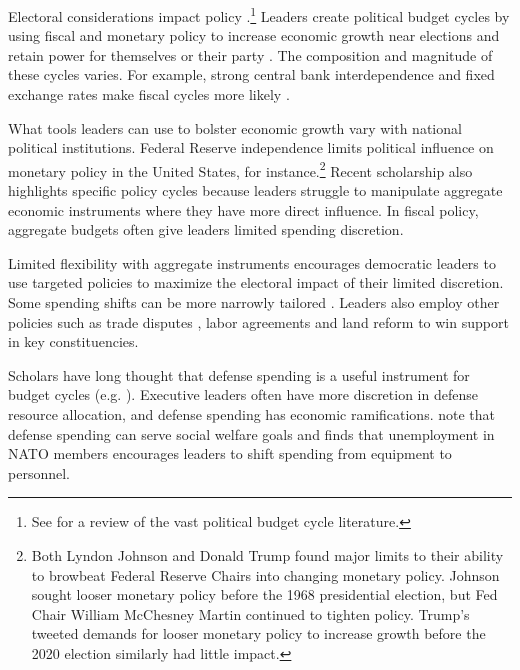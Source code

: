 \documentclass[12pt]{article}
\begin{document}
Electoral considerations impact policy \citep{Nordhaus1975}.\footnote{See \citet{Dubois2016} for a review of the vast political budget cycle literature.} 
Leaders create political budget cycles by using fiscal and monetary policy to increase economic growth near elections and retain power for themselves or their party \citep{Tufte1978, Rogoff1987}. 
The composition and magnitude of these cycles varies. 
For example, strong central bank interdependence and fixed exchange rates make fiscal cycles more likely \citep{ClarkHallerberg2000}. 


What tools leaders can use to bolster economic growth vary with national political institutions. 
Federal Reserve independence limits political influence on monetary policy in the United States, for instance.\footnote{Both Lyndon Johnson and Donald Trump found major limits to their ability to browbeat Federal Reserve Chairs into changing monetary policy. 
Johnson sought looser monetary policy before the 1968 presidential election, but Fed Chair William McChesney Martin continued to tighten policy.
Trump's tweeted demands for looser monetary policy to increase growth before the 2020 election similarly had little impact.}
Recent scholarship also highlights specific policy cycles because leaders struggle to manipulate aggregate economic instruments where they have more direct influence. 
In fiscal policy, aggregate budgets often give leaders limited spending discretion.


Limited flexibility with aggregate instruments encourages democratic leaders to use targeted policies to maximize the electoral impact of their limited discretion.
Some spending shifts can be more narrowly tailored \citep[pg. 248]{Dubois2016}.
Leaders also employ other policies such as trade disputes \citep{Conconietal2017}, labor agreements \citep{Ahlquist2010} and land reform \cite{Philips2020} to win support in key constituencies.


Scholars have long thought that defense spending is a useful instrument for budget cycles (e.g. \cite{Tufte1978, Mintz1988}).
Executive leaders often have more discretion in defense resource allocation, and defense spending has economic ramifications.
\citet{WhittenWilliams2011} note that defense spending can serve social welfare goals and \citet{Becker2021} finds that unemployment in NATO members encourages leaders to shift spending from equipment to personnel.
\end{document}
